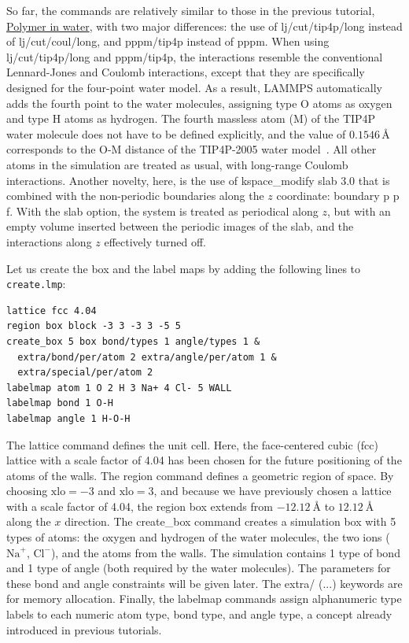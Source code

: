 \documentclass[9pt,tutorial]{livecoms}
\newcommand{\lmpcmd}[1]{\colorbox{listing}{\textcolor{command}{\small{#1}}}} %
\newcommand{\flecmd}[1]{\textcolor{command}{\texttt{#1}}} %
\begin{document}
So far, the commands are relatively similar to those in the previous tutorial,
\hyperref[all-atom-label]{Polymer in water}, with two major differences: the use
of \lmpcmd{lj/cut/tip4p/long} instead of \lmpcmd{lj/cut/coul/long}, and \lmpcmd{pppm/tip4p}
instead of \lmpcmd{pppm}.  When using \lmpcmd{lj/cut/tip4p/long} and \lmpcmd{pppm/tip4p},
the interactions resemble the conventional Lennard-Jones and Coulomb interactions,
except that they are specifically designed for the four-point water model.  As a result,
LAMMPS automatically {\color{blue}adds the fourth point to the water molecules}, assigning type O
atoms as oxygen and type H atoms as hydrogen.  The fourth massless atom (M) of the
TIP4P water molecule does not have to be defined explicitly, and the value of
$0.1546\,\text{\AA{}}$ corresponds to the O-M distance of the
TIP4P-2005 water model~\cite{abascal2005general}.  All other atoms in the simulation
are treated as usual, with long-range Coulomb interactions.  Another novelty, here, is
the use of \lmpcmd{kspace\_modify slab 3.0} that is combined with the non-periodic
boundaries along the $z$ coordinate: \lmpcmd{boundary p p f}.  With the \lmpcmd{slab}
option, the system is treated as periodical along $z$, but with an empty volume inserted
between the periodic images of the slab, and the interactions along $z$ effectively turned off.

Let us create the box and the label maps by adding the following lines to \flecmd{create.lmp}:
\begin{lstlisting}
lattice fcc 4.04
region box block -3 3 -3 3 -5 5
create_box 5 box bond/types 1 angle/types 1 &
  extra/bond/per/atom 2 extra/angle/per/atom 1 &
  extra/special/per/atom 2
labelmap atom 1 O 2 H 3 Na+ 4 Cl- 5 WALL
labelmap bond 1 O-H
labelmap angle 1 H-O-H
\end{lstlisting}
The \lmpcmd{lattice} command defines the unit cell.  Here, the face-centered cubic (fcc) lattice
with a scale factor of 4.04 has been chosen for the future positioning of the atoms
of the walls.  The \lmpcmd{region} command defines a geometric region of space.  By choosing
$\text{xlo}=-3$ and $\text{xlo}=3$, and because we have previously chosen a lattice with a scale
factor of 4.04, the region box extends from $-12.12~\text{\AA{}}$ to $12.12~\text{\AA{}}$
along the $x$ direction.  The \lmpcmd{create\_box} command creates a simulation box with
5 types of atoms: the oxygen and hydrogen of the water molecules, the two ions ($\text{Na}^+$,
$\text{Cl}^-$), and the atoms from the walls.  The simulation contains 1 type of bond
and 1 type of angle (both required by the water molecules).
The parameters for these bond and angle constraints will be given later.  The \lmpcmd{extra/ (...)}
keywords are for memory allocation.  Finally, the \lmpcmd{labelmap} commands assign
alphanumeric type labels to each numeric atom type, bond type, and angle type{\color{blue}, a concept
already introduced in previous tutorials}.
\end{document}
